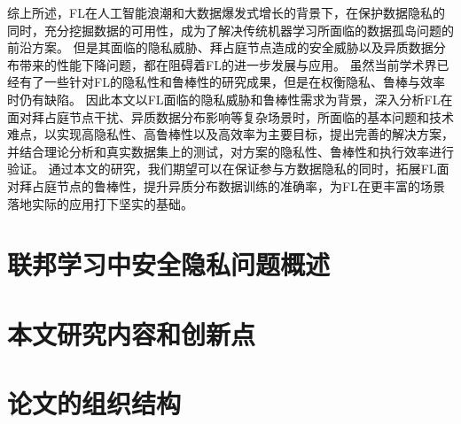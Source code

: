 综上所述，FL在人工智能浪潮和大数据爆发式增长的背景下，在保护数据隐私的同时，充分挖掘数据的可用性，成为了解决传统机器学习所面临的数据孤岛问题的前沿方案。
但是其面临的隐私威胁、拜占庭节点造成的安全威胁以及异质数据分布带来的性能下降问题，都在阻碍着FL的进一步发展与应用。
虽然当前学术界已经有了一些针对FL的隐私性和鲁棒性的研究成果，但是在权衡隐私、鲁棒与效率时仍有缺陷。
因此本文以FL面临的隐私威胁和鲁棒性需求为背景，深入分析FL在面对拜占庭节点干扰、异质数据分布影响等复杂场景时，所面临的基本问题和技术难点，以实现高隐私性、高鲁棒性以及高效率为主要目标，提出完善的解决方案，并结合理论分析和真实数据集上的测试，对方案的隐私性、鲁棒性和执行效率进行验证。
通过本文的研究，我们期望可以在保证参与方数据隐私的同时，拓展FL面对拜占庭节点的鲁棒性，提升异质分布数据训练的准确率，为FL在更丰富的场景落地实际的应用打下坚实的基础。

\section{联邦学习中安全隐私问题概述}


\section{本文研究内容和创新点}


\section{论文的组织结构}
